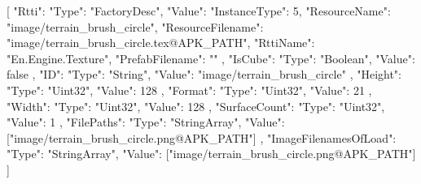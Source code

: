 [{
        "Rtti": {
            "Type": "FactoryDesc",
            "Value": {
                "InstanceType": 5,
                "ResourceName": "image/terrain_brush_circle",
                "ResourceFilename": "image/terrain_brush_circle.tex@APK_PATH",
                "RttiName": "En.Engine.Texture",
                "PrefabFilename": ""
            }
        },
        "IsCube": {
            "Type": "Boolean",
            "Value": false
        },
        "ID": {
            "Type": "String",
            "Value": "image/terrain_brush_circle"
        },
        "Height": {
            "Type": "Uint32",
            "Value": 128
        },
        "Format": {
            "Type": "Uint32",
            "Value": 21
        },
        "Width": {
            "Type": "Uint32",
            "Value": 128
        },
        "SurfaceCount": {
            "Type": "Uint32",
            "Value": 1
        },
        "FilePaths": {
            "Type": "StringArray",
            "Value": ["image/terrain_brush_circle.png@APK_PATH"]
        },
        "ImageFilenamesOfLoad": {
            "Type": "StringArray",
            "Value": ["image/terrain_brush_circle.png@APK_PATH"]
        }
    }]